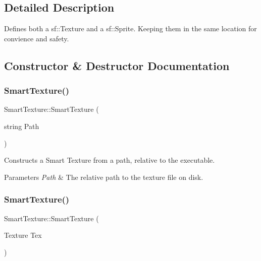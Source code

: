 \subsection{Detailed Description}
Defines both a sf\+::\+Texture and a sf\+::\+Sprite. Keeping them in the same location for convience and safety. 



\subsection{Constructor \& Destructor Documentation}
\mbox{\label{struct_smart_texture_a1709abdbcbba9136de0acce7a243a88e}} 
\subsubsection{\texorpdfstring{Smart\+Texture()}{SmartTexture()}\hspace{0.1cm}{\footnotesize\ttfamily [1/2]}}
{\footnotesize\ttfamily Smart\+Texture\+::\+Smart\+Texture (\begin{DoxyParamCaption}\item[{string}]{Path }\end{DoxyParamCaption})\hspace{0.3cm}{\ttfamily [inline]}}



Constructs a Smart Texture from a path, relative to the executable. 


\begin{DoxyParams}{Parameters}
{\em Path} & The relative path to the texture file on disk.\\
\hline
\end{DoxyParams}
\mbox{\label{struct_smart_texture_a46ac388243d615cbd00feac8fcb0f7fc}} 
\subsubsection{\texorpdfstring{Smart\+Texture()}{SmartTexture()}\hspace{0.1cm}{\footnotesize\ttfamily [2/2]}}
{\footnotesize\ttfamily Smart\+Texture\+::\+Smart\+Texture (\begin{DoxyParamCaption}\item[{Texture}]{Tex }\end{DoxyParamCaption})\hspace{0.3cm}{\ttfamily [inline]}}



